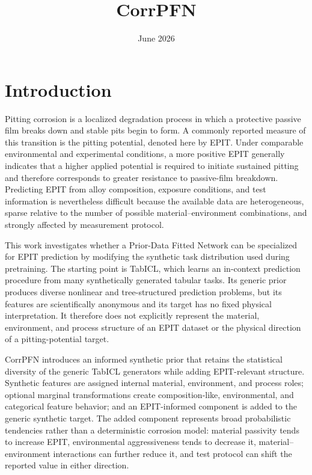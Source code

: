 \documentclass{article}
\title{CorrPFN}
\author{}
\date{June 2026}
\begin{document}
\maketitle

\section{Introduction}

Pitting corrosion is a localized degradation process in which a protective passive film breaks down and stable pits begin to form. A commonly reported measure of this transition is the pitting potential, denoted here by EPIT. Under comparable environmental and experimental conditions, a more positive EPIT generally indicates that a higher applied potential is required to initiate sustained pitting and therefore corresponds to greater resistance to passive-film breakdown. Predicting EPIT from alloy composition, exposure conditions, and test information is nevertheless difficult because the available data are heterogeneous, sparse relative to the number of possible material--environment combinations, and strongly affected by measurement protocol.

This work investigates whether a Prior-Data Fitted Network can be specialized for EPIT prediction by modifying the synthetic task distribution used during pretraining. The starting point is TabICL, which learns an in-context prediction procedure from many synthetically generated tabular tasks. Its generic prior produces diverse nonlinear and tree-structured prediction problems, but its features are scientifically anonymous and its target has no fixed physical interpretation. It therefore does not explicitly represent the material, environment, and process structure of an EPIT dataset or the physical direction of a pitting-potential target.

CorrPFN introduces an informed synthetic prior that retains the statistical diversity of the generic TabICL generators while adding EPIT-relevant structure. Synthetic features are assigned internal material, environment, and process roles; optional marginal transformations create composition-like, environmental, and categorical feature behavior; and an EPIT-informed component is added to the generic synthetic target. The added component represents broad probabilistic tendencies rather than a deterministic corrosion model: material passivity tends to increase EPIT, environmental aggressiveness tends to decrease it, material--environment interactions can further reduce it, and test protocol can shift the reported value in either direction.
\end{document}
